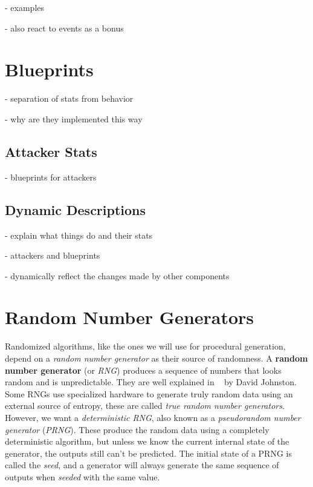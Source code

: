 - examples

- also react to events as a bonus

\section{Blueprints}

- separation of stats from behavior

- why are they implemented this way

\subsection{Attacker Stats}

- blueprints for attackers

\subsection{Dynamic Descriptions}

- explain what things do and their stats

- attackers and blueprints

- dynamically reflect the changes made by other components

\section{Random Number Generators}\label{sec:analysis-rng}

Randomized algorithms, like the ones we will use for procedural generation, depend on a \emph{random number generator} as their source of randomness.
A \textbf{random number generator} (or \emph{RNG}) produces a sequence of numbers that looks random and is unpredictable.
They are well explained in ~\cite{johnston2018random} by David Johnston.
Some RNGs use specialized hardware to generate truly random data using an external source of entropy, these are called \emph{true random number generators}.
However, we want a \emph{deterministic RNG}, also known as a \emph{pseudorandom number generator} (\emph{PRNG}).
These produce the random data using a completely deterministic algorithm, but unless we know the current internal state of the generator, the outputs still can't be predicted.
The initial state of a PRNG is called the \emph{seed}, and a generator will always generate the same sequence of outputs when \emph{seeded} with the same value.

